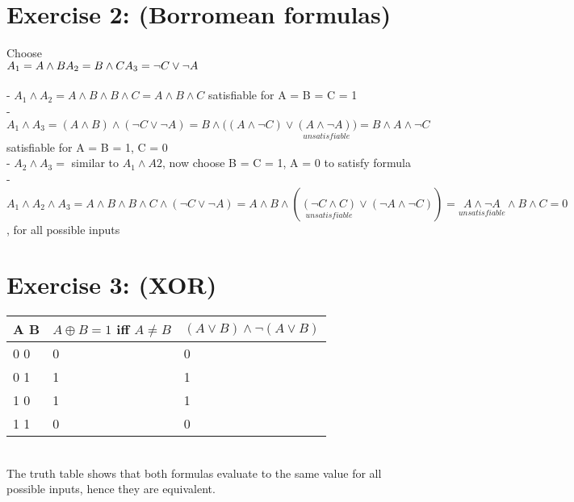 \documentclass[12pt]{article}
\begin{document}
\section*{Exercise 2: (Borromean formulas)}

Choose \\
$ 
A_1 = A \land B \\
A_2 = B \land C \\
A_3 = \neg C \lor \neg A 
$ \\ \\
- $
	A_1 \land A_2 = A \land B \land B \land C = A \land B \land C $ 
	satisfiable for A = B = C = 1 \\
- $	A_1 \land A_3 = (A \land B) \land (\neg C \lor \neg A) = B \land ( (A \land \neg C) \lor \underset{unsatisfiable}{(A \land \neg A)) } = B \land A \land \neg C
	$ \\ satisfiable for A = B = 1, C = 0 \\
- $A_2 \land A_3 =$ similar to $A_1 \land A2
$, now choose B = C = 1, A = 0 to satisfy formula \\
- $A_1 \land A_2 \land A_3 = A \land B \land B \land C \land (\neg C \lor \neg A) = A \land B \land (\underset{unsatisfiable}{(\neg C \land C)}\lor(\neg A \land \neg C)) = \underset{unsatisfiable}{A \land \neg A} \land B \land C = 0
$ , for all possible inputs \\

\section*{Exercise 3: (XOR)}

\begin{tabular}{  l | l | l }
	A B & $ A \oplus B = 1 $ iff $A \neq B$ & $ (A \lor B) \land \neg(A \lor B) $ \\ \hline
	0 0 & 0 & 0 \\
	0 1 & 1 & 1 \\
	1 0 & 1 & 1 \\
	1 1 & 0 & 0 \\
\end{tabular} 
\\

The truth table shows that both formulas evaluate to the same value for all possible inputs, hence they are equivalent.
\end{document}
